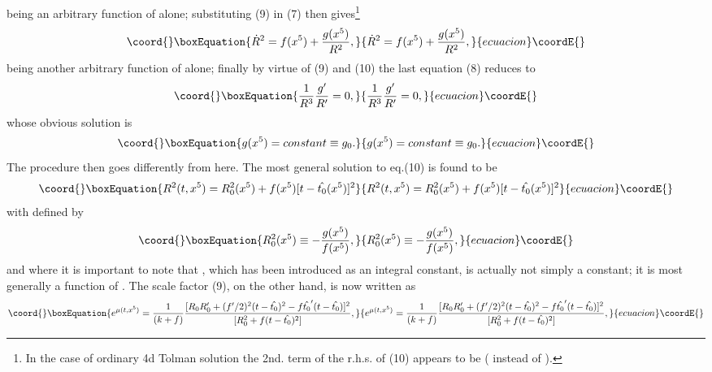 \documentclass[a4paper,12pt]{article}
\begin{document}
\coordHE{} being an arbitrary function of \coordHE{} alone; substituting
(9) in (7) then gives\footnote{In the case of ordinary 4d Tolman
solution the 2nd. term of the r.h.s. of (10) appears to be \coordHE{} ( instead of \coordHE{}).}
\begin{equation}\coord{}\boxEquation{
\dot{R}^2 =f(x^5) + \frac{g(x^5)}{R^2}  ,
}{
\dot{R}^2 =f(x^5) + \frac{g(x^5)}{R^2}  ,
}{ecuacion}\coordE{}\end{equation}
\coordHE{} being another arbitrary function of \coordHE{} alone; finally
by virtue of (9) and (10) the last equation (8) reduces to
\begin{equation}\coord{}\boxEquation{
\frac{1}{R^3}\frac{g^{\prime}}{R^\prime} = 0  ,
}{
\frac{1}{R^3}\frac{g^{\prime}}{R^\prime} = 0  ,
}{ecuacion}\coordE{}\end{equation}
whose obvious solution is
\begin{equation}\coord{}\boxEquation{
g(x^5)=constant \equiv g_0 .
}{
g(x^5)=constant \equiv g_0 .
}{ecuacion}\coordE{}\end{equation}
The procedure then goes differently from here. The most general
solution to eq.(10) is found to be
\begin{equation}\coord{}\boxEquation{
R^2(t, x^5) = R^2_0(x^5) + f(x^5)[t-\hat{t_0}(x^5) ]^2
}{
R^2(t, x^5) = R^2_0(x^5) + f(x^5)[t-\hat{t_0}(x^5) ]^2
}{ecuacion}\coordE{}\end{equation}
with \coordHE{} defined by
\begin{equation}\coord{}\boxEquation{
 R_0^2(x^5) \equiv -\frac{g(x^5)}{f(x^5)}  ,
 }{
 R_0^2(x^5) \equiv -\frac{g(x^5)}{f(x^5)}  ,
 }{ecuacion}\coordE{}\end{equation}
 and where it is important to note that \coordHE{}, which
 has been introduced as an integral constant, is actually not
 simply a constant; it is most generally a function of \coordHE{}. The
 scale factor (9), on the other hand, is now written as
 \begin{equation}\coord{}\boxEquation{
 e^{\mu(t,x^5)} = \frac{1}{(k+f)}\frac{[R_0R_0^{\prime}
 +(f^{\prime}/2)^2 (t-\hat{t_0})^2
 -f\hat{t_0}^{\prime}(t-\hat{t_0})]^2}{[R^2_0 +f(t-\hat{t_0})^2]}
 ,
 }{
 e^{\mu(t,x^5)} = \frac{1}{(k+f)}\frac{[R_0R_0^{\prime}
 +(f^{\prime}/2)^2 (t-\hat{t_0})^2
 -f\hat{t_0}^{\prime}(t-\hat{t_0})]^2}{[R^2_0 +f(t-\hat{t_0})^2]}
 ,
 }{ecuacion}\coordE{}\end{equation}
\end{document}
